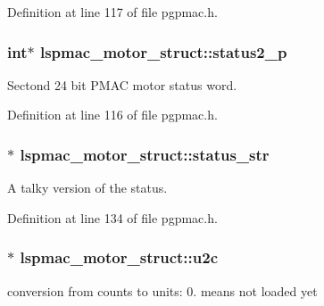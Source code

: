 Definition at line 117 of file pgpmac.\-h.

\hypertarget{structlspmac__motor__struct_a2b33ef6e12717459c1e9967cc6e659c6}{
\subsubsection[{status2\-\_\-p}]{\setlength{\rightskip}{0pt plus 5cm}int$\ast$ lspmac\-\_\-motor\-\_\-struct\-::status2\-\_\-p}}\label{structlspmac__motor__struct_a2b33ef6e12717459c1e9967cc6e659c6}


Sectond 24 bit P\-M\-A\-C motor status word. 



Definition at line 116 of file pgpmac.\-h.

\hypertarget{structlspmac__motor__struct_aa0a6bed8379c5b1f90a4eb826cde9136}{
\subsubsection[{status\-\_\-str}]{$\ast$ lspmac\-\_\-motor\-\_\-struct\-::status\-\_\-str}}\label{structlspmac__motor__struct_aa0a6bed8379c5b1f90a4eb826cde9136}


A talky version of the status. 



Definition at line 134 of file pgpmac.\-h.

\hypertarget{structlspmac__motor__struct_a8838915ebb6f9989944117c8197d5e86}{
\subsubsection[{u2c}]{$\ast$ lspmac\-\_\-motor\-\_\-struct\-::u2c}}\label{structlspmac__motor__struct_a8838915ebb6f9989944117c8197d5e86}


conversion from counts to units\-: 0. means not loaded yet 



